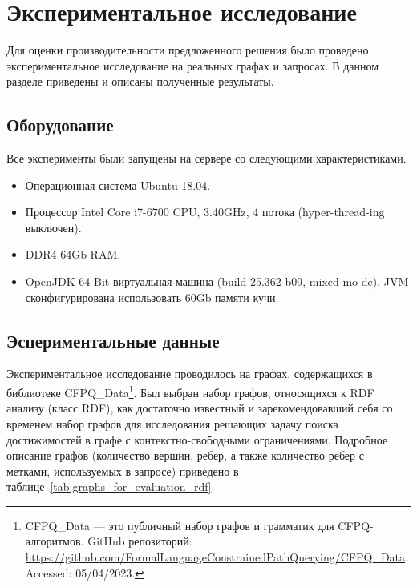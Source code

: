 \section{Экспериментальное исследование}\label{ps}

Для оценки производительности предложенного решения было проведено экспериментальное исследование на реальных графах и запросах.
В данном разделе приведены и описаны полученные результаты.

\subsection{Оборудование}
Все эксперименты были запущены на сервере со следующими характеристиками.

\begin{itemize}
    \item Операционная система Ubuntu 18.04.
    \item Процессор Intel Core i7-6700 CPU, 3.40GHz, 4 потока (hyper-thread-ing выключен).
    \item DDR4 64Gb RAM.
    \item OpenJDK 64-Bit виртуальная машина (build 25.362-b09, mixed mo-de). JVM сконфигурирована использовать 60Gb памяти кучи. 
\end{itemize}

\subsection{Эспериментальные данные}
Экспериментальное исследование проводилось на графах, содержащихся в библиотеке CFPQ\_Data\footnote{CFPQ\_Data --- это публичный набор графов и грамматик для CFPQ-алгоритмов. GitHub репозиторий: \url{https://github.com/FormalLanguageConstrainedPathQuerying/CFPQ_Data}. Accessed: 05/04/2023. }.
Был выбран набор графов, относящихся к RDF анализу (класс RDF), как достаточно известный и зарекомендовавший себя со временем набор графов для исследования решающих задачу поиска достижимостей в графе с контекстно-свободными ограничениями.
Подробное описание графов (количество вершин, ребер, а также количество ребер с метками, используемых в запросе) приведено в таблице~\ref{tab:graphs_for_evaluation_rdf}.


